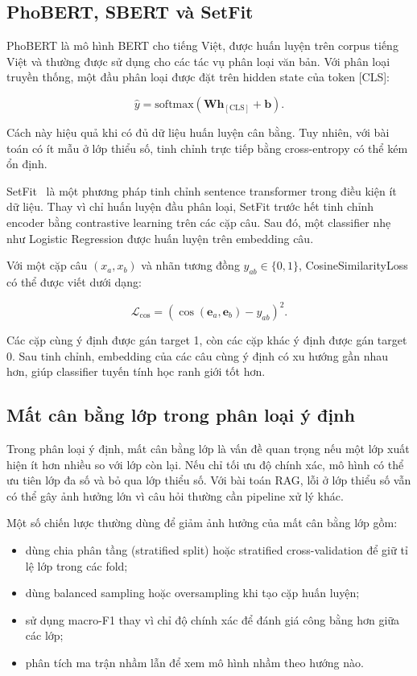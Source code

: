 \documentclass[../DoAn.tex]{subfiles}
\begin{document}
\subsection{PhoBERT, SBERT và SetFit}
\label{subsection:2.6.2}

PhoBERT là mô hình BERT cho tiếng Việt, được huấn luyện trên corpus tiếng Việt và thường được sử dụng cho các tác vụ phân loại văn bản. Với phân loại truyền thống, một đầu phân loại được đặt trên hidden state của token [CLS]:

\[
\hat{y}
=
\mathrm{softmax}
\left(
\mathbf{W}
\mathbf{h}_{[\mathrm{CLS}]}
+
\mathbf{b}
\right).
\]

Cách này hiệu quả khi có đủ dữ liệu huấn luyện cân bằng. Tuy nhiên, với bài toán có ít mẫu ở lớp thiểu số, tinh chỉnh trực tiếp bằng cross-entropy có thể kém ổn định.

SetFit~\cite{tunstall2022setfit} là một phương pháp tinh chỉnh sentence transformer trong điều kiện ít dữ liệu. Thay vì chỉ huấn luyện đầu phân loại, SetFit trước hết tinh chỉnh encoder bằng contrastive learning trên các cặp câu. Sau đó, một classifier nhẹ như Logistic Regression được huấn luyện trên embedding câu.

Với một cặp câu $(x_a,x_b)$ và nhãn tương đồng $y_{ab}\in\{0,1\}$, CosineSimilarityLoss có thể được viết dưới dạng:

\[
\mathcal{L}_{\mathrm{cos}}
=
\left(
\cos(\mathbf{e}_a,\mathbf{e}_b)
-
y_{ab}
\right)^2.
\]

Các cặp cùng ý định được gán target 1, còn các cặp khác ý định được gán target 0. Sau tinh chỉnh, embedding của các câu cùng ý định có xu hướng gần nhau hơn, giúp classifier tuyến tính học ranh giới tốt hơn.

\subsection{Mất cân bằng lớp trong phân loại ý định}
\label{subsection:2.6.3}

Trong phân loại ý định, mất cân bằng lớp là vấn đề quan trọng nếu một lớp xuất hiện ít hơn nhiều so với lớp còn lại. Nếu chỉ tối ưu độ chính xác, mô hình có thể ưu tiên lớp đa số và bỏ qua lớp thiểu số. Với bài toán RAG, lỗi ở lớp thiểu số vẫn có thể gây ảnh hưởng lớn vì câu hỏi  thường cần pipeline xử lý khác.

Một số chiến lược thường dùng để giảm ảnh hưởng của mất cân bằng lớp gồm:

\begin{itemize}
\item dùng chia phân tầng (stratified split) hoặc stratified cross-validation để giữ tỉ lệ lớp trong các fold;
\item dùng balanced sampling hoặc oversampling khi tạo cặp huấn luyện;
\item sử dụng macro-F1 thay vì chỉ độ chính xác để đánh giá công bằng hơn giữa các lớp;
\item phân tích ma trận nhầm lẫn để xem mô hình nhầm theo hướng nào.
\end{itemize}
\end{document}
